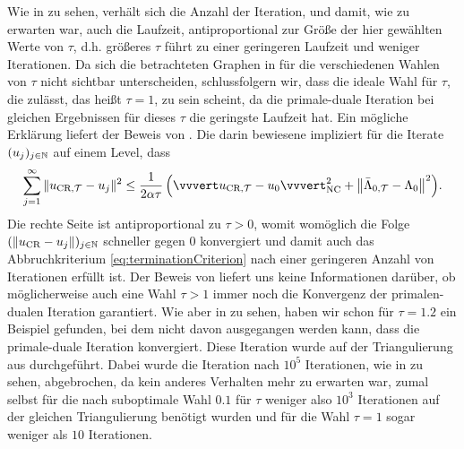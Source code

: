 Wie in  zu sehen, verhält sich die Anzahl der Iteration,
und damit, wie zu erwarten war, auch die Laufzeit, antiproportional zur Größe
der hier gewählten Werte von $\tau$, d.h. größeres $\tau$ führt zu einer
geringeren Laufzeit und weniger Iterationen.
Da sich die betrachteten Graphen in  für die
verschiedenen Wahlen von $\tau$ nicht sichtbar unterscheiden, schlussfolgern
wir, dass die ideale Wahl für $\tau$, die 
zulässt, das heißt $\tau=1$, zu sein scheint, da die primale-duale Iteration
bei gleichen Ergebnissen für dieses $\tau$ die geringste Laufzeit hat.
Ein mögliche Erklärung liefert der Beweis von .
Die darin bewiesene  impliziert für die
Iterate $(u_j)_{j\in\mathbb{N}}$ auf einem Level, dass
\begin{align}
  \label{eq:nrIterationsInequality}
  \sum_{j=1}^\infty\Vert \ucrt - u_j \Vert^2 
  \leq
  \frac{1}{2\alpha\tau}
  \left(\vvvert \ucrt - u_0\vvvert^2_\nc 
  + \left\Vert \bar\Lambda_{0,\Tcal} - \Lambda_0\right\Vert^2\right)\!. 
\end{align}
Die rechte Seite ist antiproportional zu $\tau>0$, womit womöglich
die Folge $(\left\Vert u_\textup{CR} - u_j\right\Vert)_{j\in\mathbb{N}}$ schneller gegen $0$
konvergiert und damit auch das Abbruchkriterium \eqref{eq:terminationCriterion}
nach einer geringeren Anzahl von Iterationen erfüllt ist. 
Der Beweis von  liefert uns keine
Informationen darüber, ob möglicherweise auch eine Wahl $\tau>1$ immer noch die
Konvergenz der primalen-dualen Iteration garantiert.
Wie aber in  zu sehen, haben wir schon für
$\tau=1.2$ ein Beispiel gefunden, bei dem nicht davon ausgegangen werden kann,
dass die primale-duale Iteration konvergiert.
Diese Iteration wurde auf der Triangulierung aus  
durchgeführt. 
Dabei wurde die Iteration nach $10^5$ Iterationen, wie in
 zu sehen, abgebrochen, da kein anderes
Verhalten mehr zu erwarten war, zumal selbst für die nach
 suboptimale Wahl $0.1$ für $\tau$ weniger also $10^3$
Iterationen auf der gleichen Triangulierung benötigt wurden und für die Wahl
$\tau=1$ sogar weniger als $10$ Iterationen.
